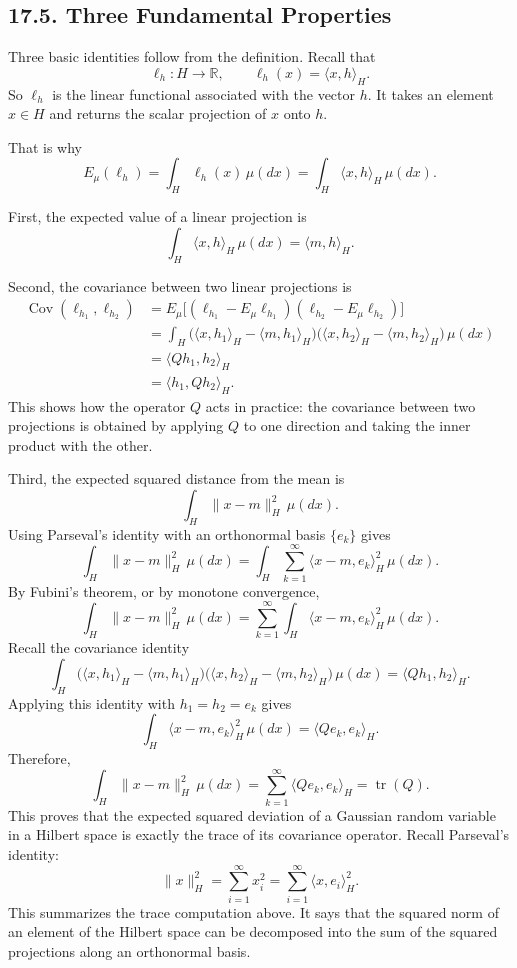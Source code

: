 \documentclass[11pt]{article}
\theoremstyle{definition}
\theoremstyle{remark}
\begin{document}
\subsection*{17.5. Three Fundamental Properties}
Three basic identities follow from the definition.
Recall that
\[
\ell_h:H\to\mathbb R,\qquad \ell_h(x)=\langle x,h\rangle_H.
\]
So $\ell_h$ is the linear functional associated with the vector $h$. It takes an element $x\in H$ and returns the scalar projection of $x$ onto $h$.

That is why
\[
E_\mu(\ell_h)
=
\int_H \ell_h(x)\,\mu(dx)
=
\int_H \langle x,h\rangle_H\,\mu(dx).
\]

First, the expected value of a linear projection is
\[
\int_H \langle x,h\rangle_H\,\mu(dx)=\langle m,h\rangle_H.
\]

Second, the covariance between two linear projections is
\begin{align*}
\operatorname{Cov}(\ell_{h_1},\ell_{h_2})
&=
E_\mu\bigl[(\ell_{h_1}-E_\mu\ell_{h_1})(\ell_{h_2}-E_\mu\ell_{h_2})\bigr] \\
&=
\int_H
\bigl(\langle x,h_1\rangle_H-\langle m,h_1\rangle_H\bigr)
\bigl(\langle x,h_2\rangle_H-\langle m,h_2\rangle_H\bigr)\,\mu(dx) \\
&=
\langle Qh_1,h_2\rangle_H \\
&=
\langle h_1,Qh_2\rangle_H.
\end{align*}
This shows how the operator $Q$ acts in practice: the covariance between two projections is obtained by applying $Q$ to one direction and taking the inner product with the other.

Third, the expected squared distance from the mean is
\[
\int_H \|x-m\|_H^2\,\mu(dx).
\]
Using Parseval's identity with an orthonormal basis $\{e_k\}$ gives
\[
\int_H \|x-m\|_H^2\,\mu(dx)
=
\int_H \sum_{k=1}^{\infty}\langle x-m,e_k\rangle_H^2\,\mu(dx).
\]
By Fubini's theorem, or by monotone convergence,
\[
\int_H \|x-m\|_H^2\,\mu(dx)
=
\sum_{k=1}^{\infty}\int_H \langle x-m,e_k\rangle_H^2\,\mu(dx).
\]
Recall the covariance identity
\[
\int_H
\bigl(\langle x,h_1\rangle_H-\langle m,h_1\rangle_H\bigr)
\bigl(\langle x,h_2\rangle_H-\langle m,h_2\rangle_H\bigr)\,\mu(dx)
=
\langle Qh_1,h_2\rangle_H.
\]
Applying this identity with $h_1=h_2=e_k$ gives
\[
\int_H \langle x-m,e_k\rangle_H^2\,\mu(dx)=\langle Qe_k,e_k\rangle_H.
\]
Therefore,
\[
\int_H \|x-m\|_H^2\,\mu(dx)
=
\sum_{k=1}^{\infty}\langle Qe_k,e_k\rangle_H
=
\operatorname{tr}(Q).
\]
This proves that the expected squared deviation of a Gaussian random variable in a Hilbert space is exactly the trace of its covariance operator.
Recall Parseval's identity:
\[
\|x\|_H^2=\sum_{i=1}^{\infty}x_i^2=\sum_{i=1}^{\infty}\langle x,e_i\rangle_H^2.
\]
This summarizes the trace computation above. It says that the squared norm of an element of the Hilbert space can be decomposed into the sum of the squared projections along an orthonormal basis.
\end{document}
